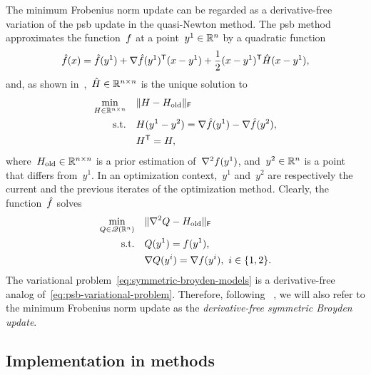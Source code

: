 The minimum Frobenius norm update can be regarded as a derivative-free variation of the \gls{psb} update in the quasi-Newton method.
The \gls{psb} method~\cite{Powell_1970b} approximates the function~$f$ at a point~$y^1 \in \mathbb{R}^n$ by a quadratic function
\begin{align*}
    \objm(\iter) = \objm(y^1) + \nabla \objm(y^1)^{\T} (\iter - y^1) + \frac{1}{2} (\iter - y^1)^{\T} \hat{H} (\iter - y^1),
\end{align*}
and, as shown in~\cite[Thm.~4.2]{Dennis_Schnabel_1979},~$\hat{H} \in \mathbb{R}^{n \times n}$ is the unique solution to
\begin{align*}
    \min_{H \in \R^{n \times n}}    & \quad \norm{H - H_{\text{old}}}_{\mathsf{F}}\\
    \text{s.t.}                     & \quad H (y^1 - y^2) = \nabla \objm(y^1) - \nabla \objm(y^2),\\
                                    & \quad H^{\T} = H,
\end{align*}
where~$H_{\text{old}} \in \mathbb{R}^{n \times n}$ is a prior estimation of~$\nabla^2 f(y^1)$, and~$y^2 \in \mathbb{R}^n$ is a point that differs from~$y^1$.
In an optimization context,~$y^1$ and~$y^2$ are respectively the current and the previous iterates of the optimization method.
Clearly, the function~$\objm$ solves
\begin{subequations}
    \label{eq:psb-variational-problem}
    \begin{align}
        \min_{Q \in \mathscr{Q}(\mathbb{R}^n)} & \quad \lVert\nabla^2 Q - H_{\text{old}}\rVert_{\mathsf{F}}\\
        \text{s.t.}         & \quad Q(y^1) = f(y^1),\\
                            & \quad \nabla Q(y^i) = \nabla f(y^i), ~ i \in \{1, 2\}.
    \end{align}
\end{subequations}
The variational problem~\cref{eq:symmetric-broyden-models} is a derivative-free analog of~\cref{eq:psb-variational-problem}.
Therefore, following \citeauthor{Powell_2013}~\cite{Powell_2013}, we will also refer to the minimum Frobenius norm update as the \emph{derivative-free symmetric Broyden update}.

\subsection{Implementation in  methods}
\label{subsec:implementation-symmetric-broyden-update}

